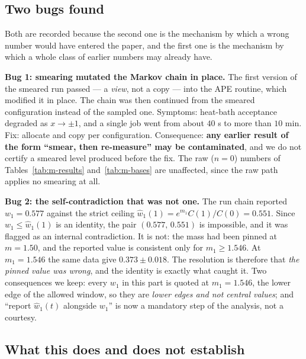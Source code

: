 \subsection{Two bugs found}
\label{sec:m-bugs}

Both are recorded because the second one is the mechanism by which a wrong number would have entered
the paper, and the first one is the mechanism by which a whole class of earlier numbers may already
have.

\begin{qbox}
\textbf{Bug 1: smearing mutated the Markov chain in place.} The first version of the smeared run
passed  --- a  \emph{view}, not a copy --- into the APE routine, which
modified it in place. The chain was then continued from the smeared configuration instead of the
sampled one. Symptoms: heat-bath acceptance degraded as $x\to\pm1$, and a single job went from about
$40$ s to more than $10$ min. Fix: allocate  and copy per
configuration. Consequence: \textbf{any earlier result of the form ``smear, then re-measure'' may be
contaminated}, and we do not certify a smeared level produced before the fix. The raw ($n=0$) numbers
of Tables~\ref{tab:m-results} and~\ref{tab:m-bases} are unaffected, since the raw path applies no
smearing at all.

\textbf{Bug 2: the self-contradiction that was not one.} The run chain reported $w_1=0.577$ against
the strict ceiling $\hat w_1(1)=e^{m_1}C(1)/C(0)=0.551$. Since $w_1\le\hat w_1(1)$ is an identity,
the pair $(0.577,\,0.551)$ is impossible, and it was flagged as an internal contradiction. It is not:
the mass had been pinned at $m=1.50$, and the reported value is consistent only for $m_1\ge1.546$.
At $m_1=1.546$ the same data give $0.373\pm0.018$. The resolution is therefore that \emph{the pinned
value was wrong}, and the identity is exactly what caught it. Two consequences we keep: every $w_1$
in this part is quoted at $m_1=1.546$, the lower edge of the allowed window, so they are
\emph{lower edges and not central values}; and ``report $\hat w_1(t)$ alongside $w_1$'' is now a
mandatory step of the analysis, not a courtesy.
\end{qbox}

\subsection{What this does and does not establish}
\label{sec:m-scope}

